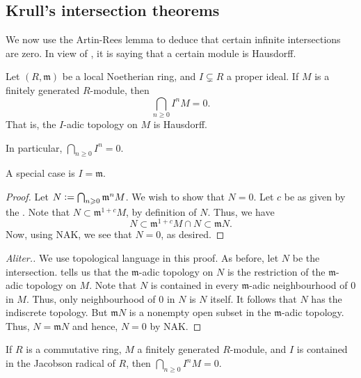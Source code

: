 \documentclass[12pt]{article}
\begin{document}
\subsection{Krull's intersection theorems}

We now use the Artin-Rees lemma to deduce that certain infinite intersections are zero. In view of , it is saying that a certain module is Hausdorff.

\begin{thm} \label{thm:KIT}
	Let $(R, \mathfrak{m})$ be a local Noetherian ring, and $I \subsetneq R$ a proper ideal. If $M$ is a finitely generated $R$-module, then
	\begin{equation*} 
		\bigcap_{n \ge 0} I^{n} M = 0.
	\end{equation*}
	That is, the $I$-adic topology on $M$ is Hausdorff. 

	In particular, $\bigcap_{n \ge 0} I^{n} = 0$. 
\end{thm}
A special case is $I = \mathfrak{m}$. 
\begin{proof} 
	Let $N \vcentcolon= \bigcap_{n \ge 0} \mathfrak{m}^{n} M$. We wish to show that $N = 0$. Let $c$ be as given by the . Note that $N \subset \mathfrak{m}^{1 + c} M$, by definition of $N$. Thus, we have
	\begin{equation*} 
		N \subset \mathfrak{m}^{1 + c} M \cap N \subset \mathfrak{m} N.
	\end{equation*}
	Now, using NAK, we see that $N = 0$, as desired.
\end{proof}
\begin{proof}[Aliter.]
	We use topological language in this proof. As before, let $N$ be the intersection. \newline
	 tells us that the $\mathfrak{m}$-adic topology on $N$ is the restriction of the $\mathfrak{m}$-adic topology on $M$. Note that $N$ is contained in every $\mathfrak{m}$-adic neighbourhood of $0$ in $M$. Thus, only neighbourhood of $0$ in $N$ is $N$ itself. \newline
	It follows that $N$ has the indiscrete topology. But $\mathfrak{m} N$ is a nonempty open subset in the $\mathfrak{m}$-adic topology. Thus, $N = \mathfrak{m} N$ and hence, $N = 0$ by NAK.
\end{proof}

\begin{por}
	If $R$ is a commutative ring, $M$ a finitely generated $R$-module, and $I$ is contained in the Jacobson radical of $R$, then $\bigcap_{n \ge 0} I^{n} M = 0$.
\end{por}
\end{document}
